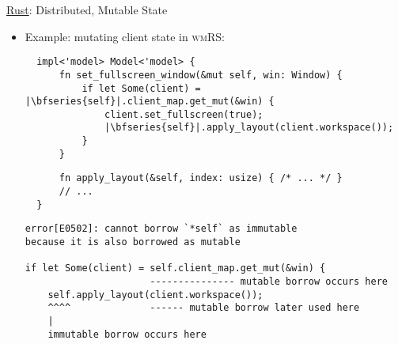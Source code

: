 \begin{frame}[fragile]{\underline{Rust}: Distributed, Mutable State \hfill {\footnotesize \currentname}}


    \begin{itemize}

    \item Example: mutating client state in \textsc{wmRS}:\\[3pt]
\begin{verbatim}
  impl<'model> Model<'model> {
      fn set_fullscreen_window(&mut self, win: Window) {
          if let Some(client) = |\bfseries{self}|.client_map.get_mut(&win) {
              client.set_fullscreen(true);
              |\bfseries{self}|.apply_layout(client.workspace());
          }
      }
\end{verbatim}
\begin{verbatim}
      fn apply_layout(&self, index: usize) { /* ... */ }
      // ...
  }
\end{verbatim}

\vspace*{6pt}\begin{verbatim}
error[E0502]: cannot borrow `*self` as immutable
because it is also borrowed as mutable

if let Some(client) = self.client_map.get_mut(&win) {
                      --------------- mutable borrow occurs here
    self.apply_layout(client.workspace());
    ^^^^              ------ mutable borrow later used here
    |
    immutable borrow occurs here
\end{verbatim}

    \end{itemize}

    \vfill

\end{frame}

